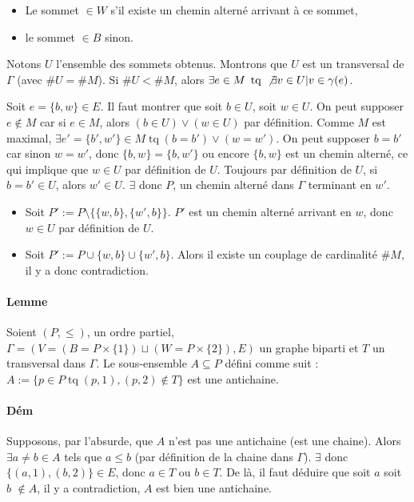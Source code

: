 \documentclass{article}
\DeclareMathOperator{\tq}{\text{ tq }}
\begin{document}
			\begin{itemize}
				\item Le sommet $\in W$ s'il existe un chemin alterné arrivant à ce sommet,
				\item le sommet $\in B$ sinon.
			\end{itemize}

			Notons $U$ l'ensemble des sommets obtenus. Montrons que $U$ est un transversal de $\Gamma$ (avec $\#U = \#M$). Si $\#U < \#M$,
			alors $\exists e \in M \tq \not \exists v \in U | v \in \gamma(e)$.

			Soit $e = \{b, w\} \in E$. Il faut montrer que soit $b \in U$, soit $w \in U$. On peut supposer $e \not \in M$ car si $e \in M$, alors
			$(b \in U) \lor (w \in U)$ par définition. Comme $M$ est maximal, $\exists e' = \{b', w'\} \in M \tq (b = b') \lor (w = w')$.
			On peut supposer $b = b'$ car sinon $w = w'$, donc $\{b, w\} = \{b, w'\}$ ou encore $\{b, w\}$ est un chemin alterné, ce qui implique
			que $w \in U$ par définition de $U$. Toujours par définition de $U$, si $b = b' \in U$, alors $w' \in U$. $\exists$ donc $P$, un chemin
			alterné dans $\Gamma$ terminant en $w'$.

			\begin{itemize}
				\item Soit $P' := P \setminus \{\{w, b\}, \{w', b\}\}$. $P'$ est un chemin alterné arrivant en $w$, donc $w \in U$ par définition de
					  $U$.
				\item Soit $P' := P \cup \{w, b\} \cup \{w', b\}$. Alors il existe un couplage de cardinalité $\#M$, il y a donc contradiction.
			\end{itemize}

			\paragraph{Lemme} Soient $(P, \leq)$, un ordre partiel, $\Gamma = (V = (B = P \times \{1\}) \sqcup (W = P \times \{2\}), E)$ un graphe
			biparti et $T$ un transversal dans $\Gamma$. Le sous-ensemble $A \subseteq P$ défini comme suit :
			$A := \{p \in P \tq (p, 1), (p, 2) \not \in T\}$ est une antichaine.

			\paragraph{Dém} Supposons, par l'absurde, que $A$ n'est pas une antichaine (est une chaine). Alors $\exists a \neq b \in A$ tels que
			$a \leq b$ (par définition de la chaine dans $\Gamma$). $\exists$ donc $\{(a, 1), (b, 2)\} \in E$, donc $a \in T$ ou $b \in T$. De là,
			il faut déduire que soit $a$ soit $b$ $\not \in A$, il y a contradiction, $A$ est bien une antichaine.
\end{document}
